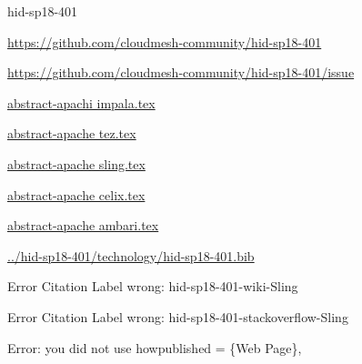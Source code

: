 \begin{IU}

hid-sp18-401

\url{https://github.com/cloudmesh-community/hid-sp18-401}

\url{https://github.com/cloudmesh-community/hid-sp18-401/issue}

\href{https://github.com/cloudmesh-community/hid-sp18-401/blob/master//technology/abstract-apachi impala.tex}{abstract-apachi impala.tex}

\href{https://github.com/cloudmesh-community/hid-sp18-401/blob/master//technology/abstract-apache tez.tex}{abstract-apache tez.tex}

\href{https://github.com/cloudmesh-community/hid-sp18-401/blob/master//technology/abstract-apache sling.tex}{abstract-apache sling.tex}

\href{https://github.com/cloudmesh-community/hid-sp18-401/blob/master//technology/abstract-apache celix.tex}{abstract-apache celix.tex}

\href{https://github.com/cloudmesh-community/hid-sp18-401/blob/master//technology/abstract-apache ambari.tex}{abstract-apache ambari.tex}

\href{https://github.com/cloudmesh-community/hid-sp18-401/blob/master//technology/hid-sp18-401.bib}{../hid-sp18-401/technology/hid-sp18-401.bib}

 Error Citation Label wrong:  hid-sp18-401-wiki-Sling

 Error Citation Label wrong:  hid-sp18-401-stackoverflow-Sling

Error: you did not use howpublished = \{Web Page\},

\end{IU}


